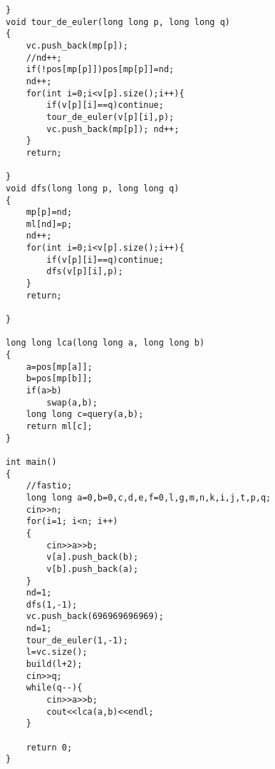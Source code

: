 \documentclass[10pt,a4paper,onesided]{article}
\begin{document}
\begin{multicols*}{3}
\begin{lstlisting}
}
void tour_de_euler(long long p, long long q)
{
    vc.push_back(mp[p]);
    //nd++;
    if(!pos[mp[p]])pos[mp[p]]=nd;
    nd++;
    for(int i=0;i<v[p].size();i++){
        if(v[p][i]==q)continue;
        tour_de_euler(v[p][i],p);
        vc.push_back(mp[p]); nd++;
    }
    return;

}
void dfs(long long p, long long q)
{
    mp[p]=nd;
    ml[nd]=p;
    nd++;
    for(int i=0;i<v[p].size();i++){
        if(v[p][i]==q)continue;
        dfs(v[p][i],p);
    }
    return;

}

long long lca(long long a, long long b)
{
    a=pos[mp[a]];
    b=pos[mp[b]];
    if(a>b)
        swap(a,b);
    long long c=query(a,b);
    return ml[c];
}

int main()
{
    //fastio;
    long long a=0,b=0,c,d,e,f=0,l,g,m,n,k,i,j,t,p,q;
    cin>>n;
    for(i=1; i<n; i++)
    {
        cin>>a>>b;
        v[a].push_back(b);
        v[b].push_back(a);
    }
    nd=1;
    dfs(1,-1);
    vc.push_back(696969696969);
    nd=1;
    tour_de_euler(1,-1);
    l=vc.size();
    build(l+2);
    cin>>q;
    while(q--){
        cin>>a>>b;
        cout<<lca(a,b)<<endl;
    }

    return 0;
}
\end{lstlisting}

\end{multicols*}
\end{document}
